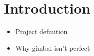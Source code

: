 \section{Introduction}

\begin{itemize}
	\item Project definition
	\item Why gimbal isn't perfect
\end{itemize}



